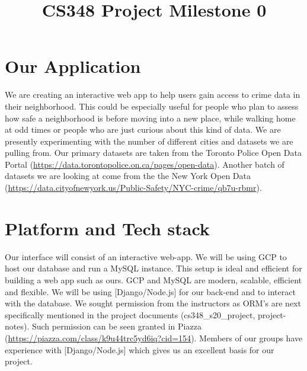 \documentclass{article}
\title{CS348 Project Milestone 0}
\author{}
\begin{document}
\maketitle

\section*{Our Application}
We are creating an interactive web app to help users gain access to crime data in their neighborhood. This could be especially useful for people who plan to assess how safe a neighborhood is before moving into a new place, while walking home at odd times or people who are just curious about this kind of data. We are presently experimenting with the number of different cities and datasets we are pulling from. Our primary datasets are taken from the Toronto Police Open Data Portal (\url{https://data.torontopolice.on.ca/pages/open-data}). Another batch of datasets we are looking at come from the  the New York Open Data (\url{https://data.cityofnewyork.us/Public-Safety/NYC-crime/qb7u-rbmr}). 
\section*{Platform and Tech stack}
Our interface will consist of an interactive web-app. We will be using GCP to host our database and run a MySQL instance. This setup is ideal and efficient for building a web app such as ours. GCP and MySQL are modern, scalable, efficient and flexible. We will be using [Django/Node.js] for our back-end and to interact with the database. We sought permission from the instructors as ORM’s are next specifically mentioned in the project documents (cs348\_s20\_project, project-notes). Such permission can be seen granted in Piazza (\url{https://piazza.com/class/k9u44trc5yd6iq?cid=154}). Members of our groups have experience with [Django/Node.js] which gives us an excellent basis for our project.
\end{document}
